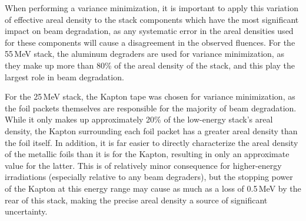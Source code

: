 When performing  a variance minimization, it is important to apply this variation of effective areal density  to the stack components which  have the most significant impact on beam degradation, as any systematic error in the areal densities used for these components will cause a disagreement in the observed fluences.
For the 55\,MeV stack, the aluminum degraders are used for variance minimization, as they make up more than 80\% of the areal density of the stack, and this play the largest role in beam degradation.
% 
% 
% 

For the 25\,MeV stack, the Kapton tape was chosen for variance minimization, as the foil packets themselves are responsible for the majority of beam degradation.
While it only makes up approximately 20\% of the low-energy stack's areal density, the Kapton surrounding each foil packet has a greater areal density than the foil itself.
In addition, it is far easier to directly characterize the areal density of the metallic foils than it is for the Kapton, resulting in only an approximate value for the latter.
This is of relatively minor consequence for higher-energy irradiations (especially relative to any beam degraders), but the stopping power of the Kapton at this energy range may cause as much as a loss of 0.5\,MeV by the rear of this stack, making the precise areal density a source of significant uncertainty.




